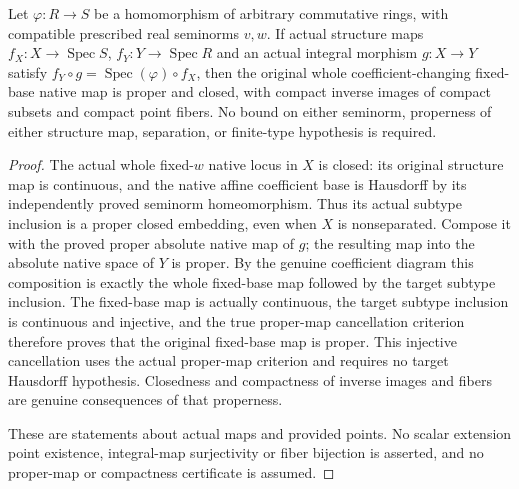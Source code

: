 \begin{theorem}
\label{scheme:integral-native-coefficient-change}
\leanok
{}
Let $\varphi:R\to S$ be a homomorphism of arbitrary commutative rings,
with compatible prescribed real seminorms $v,w$. If actual structure
maps $f_X:X\to\operatorname{Spec}S$, $f_Y:Y\to\operatorname{Spec}R$
and an actual integral morphism $g:X\to Y$ satisfy
$f_Y\circ g=\operatorname{Spec}(\varphi)\circ f_X$, then the original
whole coefficient-changing fixed-base native map is proper and closed,
with compact inverse images of compact subsets and compact point
fibers. No bound on either seminorm, properness of either structure map,
separation, or finite-type hypothesis is required.
\end{theorem}
\begin{proof}
The actual whole fixed-$w$ native locus in $X$ is closed: its original
structure map is continuous, and the native affine coefficient base is
Hausdorff by its independently proved seminorm homeomorphism. Thus its
actual subtype inclusion is a proper closed embedding, even when $X$
is nonseparated. Compose it with the proved proper absolute native map
of $g$; the resulting map into the absolute native space of $Y$ is
proper. By the genuine coefficient diagram this composition is exactly
the whole fixed-base map followed by the target subtype inclusion.
The fixed-base map is actually continuous, the target subtype inclusion
is continuous and injective, and the true proper-map cancellation
criterion therefore proves that the original fixed-base map is proper.
This injective cancellation uses the actual proper-map criterion and
requires no target Hausdorff hypothesis. Closedness and compactness of
inverse images and fibers are genuine consequences of that properness.

These are statements about actual maps and provided points. No scalar
extension point existence, integral-map surjectivity or fiber bijection
is asserted, and no proper-map or compactness certificate is assumed.
\end{proof}
